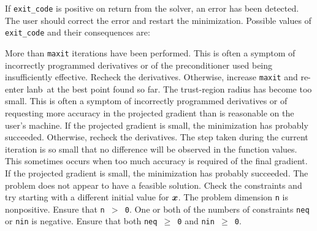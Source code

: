 \documentclass{galahad}
\newcommand{\package}{lanb}
\begin{document}
If {\tt exit\_code} is positive
on return from the solver, an error has been detected.
The user should correct the error and restart the minimization.
Possible values of {\tt exit\_code} and their consequences are:
\begin{description}
 More than {\tt maxit} iterations have been
      performed. This is often a symptom of incorrectly programmed
      derivatives or of the preconditioner used being
      insufficiently effective. Recheck the derivatives.
      Otherwise, increase {\tt maxit} and re-enter \package\
      at the best point found so far.
 The trust-region radius
      has become too small. This is
      often a symptom of incorrectly programmed derivatives
      or of requesting more accuracy in the projected gradient
      than is reasonable on the user's machine.
      If the projected gradient
      is small, the minimization
      has probably succeeded. Otherwise, recheck the derivatives.
\itt{exit\_code $= 3.$} The step taken during the current iteration is so
      small that
      no difference will be observed in the function values.
      This sometimes occurs when too much accuracy is required of
      the final gradient. If the projected gradient
      is small, the minimization has probably succeeded.
 The problem does not appear to have a feasible
     solution. Check the constraints and try starting with a different
     initial value for ${\bm{x}}$.
 The problem dimension
     {\tt n} is nonpositive. Ensure that {\tt n $>$ 0}.
 One or both of the numbers of constraints
      {\tt neq} or {\tt nin} is negative. Ensure that both {\tt neq $\geq$ 0}
      and {\tt nin $\geq$ 0}.
\end{description}

\galinfo
\end{document}
